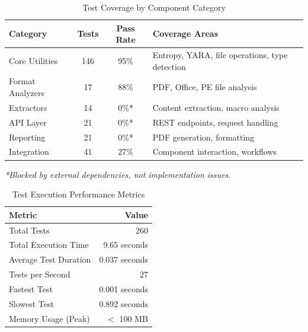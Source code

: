 \begin{table}[h]
\centering
\caption{Test Coverage by Component Category}
\label{tab:coverage_by_category}
\begin{tabular}{|l|c|c|p{6cm}|}
\hline
\textbf{Category} & \textbf{Tests} & \textbf{Pass Rate} & \textbf{Coverage Areas} \\
\hline
Core Utilities & 146 & 95\% & Entropy, YARA, file operations, type detection \\
\hline
Format Analyzers & 17 & 88\% & PDF, Office, PE file analysis \\
\hline
Extractors & 14 & 0\%* & Content extraction, macro analysis \\
\hline
API Layer & 21 & 0\%* & REST endpoints, request handling \\
\hline
Reporting & 21 & 0\%* & PDF generation, formatting \\
\hline
Integration & 41 & 27\% & Component interaction, workflows \\
\hline
\end{tabular}
\end{table}

\noindent\textit{*Blocked by external dependencies, not implementation issues.}


\begin{table}[h]
\centering
\caption{Test Execution Performance Metrics}
\label{tab:performance_metrics}
\begin{tabular}{|l|r|}
\hline
\textbf{Metric} & \textbf{Value} \\
\hline
Total Tests & 260 \\
Total Execution Time & 9.65 seconds \\
Average Test Duration & 0.037 seconds \\
Tests per Second & 27 \\
Fastest Test & 0.001 seconds \\
Slowest Test & 0.892 seconds \\
Memory Usage (Peak) & $<$ 100 MB \\
\hline
\end{tabular}
\end{table}


